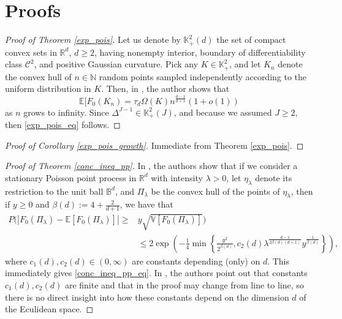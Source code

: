 \documentclass[12pt, reqno]{amsart}
\theoremstyle{definition}
\begin{document}
\section{Proofs}\label{proofs}
\iffalse
\begin{proof}[Proof of Theorem \ref{exp_pois}]
Let us denote by $\mathbb{K}^2_+(d)$ the set of compact convex sets in $\mathbb{R}^d$, $d \geq 2$, having nonempty interior, boundary of differentiability class $\mathcal{C}^2$, and positive Gaussian curvature. Pick any $K \in \mathbb{K}^2_+$, and let $K_n$ denote the convex hull of $n\in\mathbb{N}$ random points sampled independently according to the uniform distribution in $K$. 
Then, in \cite[page 485]{reitzner1}, the author shows that
$$\mathbb{E}[F_0(K_n) = \tau_d \Omega(K)n^{\frac{d-1}{d+1}}\left(1+o(1)\right)$$
as $n$ grows to infinity. Since $\Delta^{J-1} \in \mathbb{K}^2_+(J)$, and because we assumed $J\geq 2$, then \eqref{exp_pois_eq} follows.
\end{proof}

\begin{proof}[Proof of Corollary \ref{exp_pois_growth}]
Immediate from Theorem \ref{exp_pois}.
\end{proof}



\begin{proof}[Proof of Theorem \ref{conc_ineq_pp}]
    In \cite[Theorem 1.1]{grote}, the authors show that if we consider a stationary Poisson point process in $\mathbb{R}^d$ with intensity $\lambda>0$, let $\eta_\lambda$ denote its restriction to the unit ball $\mathbb{B}^d$, and $\Pi_\lambda$ be the convex hull of the points of $\eta_\lambda$, then if $y\geq 0$ and $\beta(d):=4+\frac{2}{d+1}$, we have that 
    \begin{align*}
    P\bigg( \left| F_0(\Pi_\lambda)-\mathbb{E}[F_0(\Pi_\lambda)] \right| \geq &y \sqrt{\mathbb{V}[F_0(\Pi_\lambda)]} \bigg)\\ &\leq 2 \exp \left( -\frac{1}{4} \min\left\lbrace{\frac{y^2}{2^{\beta(d)}},c_2(d) \lambda^{\frac{d-1}{2\beta(d)(d+1)}}y^{\frac{1}{\beta(d)}}}\right\rbrace \right),
\end{align*}
    where $c_1(d),c_2(d)\in(0,\infty)$ are constants depending (only) on $d$. This immediately gives \eqref{conc_ineq_pp_eq}. In \cite[Section 5]{grote}, the authors point out that constants $c_1(d),c_2(d)$ are finite and that in the proof may change from line to line, so there is no direct insight into how these constants depend on the dimension $d$ of the Eculidean space.
\end{proof}
\end{document}
